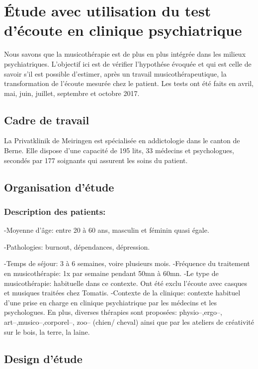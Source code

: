 \chapter[\'Etude en clinique]{\'Etude avec utilisation du test
  d'écoute en clinique psychiatrique}

Nous savons que la musicothérapie est de plus en plus intégrée dans
les milieux psychiatriques.
L'objectif ici est de vérifier l'hypothése évoquée et qui est celle de savoir s'il est possible d'estimer, après un travail 
musicothérapeutique, la transformation de l'écoute mesurée chez le
patient.
Les tests ont été faits en avril, mai, juin, juillet, septembre et octobre 2017.

\section{Cadre de travail}

 La Privatklinik
de Meiringen est  spécialisée en
addictologie dans le canton de Berne. Elle dispose d'une capacité de 195 lits, 33 médecins et
psychologues, secondés par 177 soignants qui assurent les soins du
patient.


\section{Organisation d'étude}

\subsection{Description des patients:}


-Moyenne d'âge:  entre 20 à 60 ans, masculin et féminin quasi égale.


-Pathologies:  burnout, dépendances, dépression.

-Temps de séjour: 3 à 6 semaines, voire plusieurs mois.
-Fréquence du traitement en musicothérapie: 1x par semaine pendant
50mn à 60mn.
-Le type de musicothérapie: habituelle dans ce contexte.
Ont été  exclu l'écoute avec casques et  musiques traitées chez Tomatis.
-Contexte de la clinique: contexte habituel d'une prise en
charge en clinique psychiatrique 
par les médecins et  les psychologues.
En plus, diverses thérapies sont proposées: physio--,ergo--,
art--,musico--,corporel--, zoo--  (chien/ cheval)  ainsi
que par les  ateliers de créativité sur le bois, la terre, la laine.  


\section{Design d'étude}

